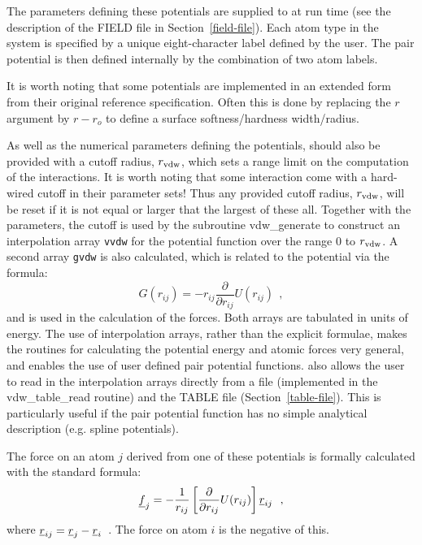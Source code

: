 The parameters defining these potentials are supplied to \D at run
time (see the description of the FIELD file in Section~\ref{field-file}).
Each atom type in the system is specified by a unique eight-character
label defined by the user.  The pair potential is then defined internally
by the combination of two atom labels.

It is worth noting that some potentials are implemented in an extended
form from their original reference specification.  Often this is done
by replacing the $r$ argument by $r-r_{o}$ to define a surface
softness/hardness width/radius.

As well as the numerical parameters defining the potentials, \D
should also be provided with a cutoff radius, $r_{\rm vdw}$, which
sets a range limit on the computation of the interactions.  It is
worth noting that some interaction come with a hard-wired cutoff in
their parameter sets!  Thus any provided cutoff radius, $r_{\rm vdw}$,
will be reset if it is not equal or larger that the largest of these all.
Together with the parameters, the cutoff is used by the subroutine
{\sc vdw\_generate} to construct an interpolation array {\tt vvdw} for
the potential function over the range 0 to $r_{\rm vdw}$.  A second
array {\tt gvdw} is also calculated, which is related to the
potential via the formula:
\begin{equation}
G(r_{ij}) = -r_{ij}\frac{\partial}{\partial r_{ij}}U(r_{ij})~~,
\end{equation}
and is used in the calculation of the forces.  Both arrays are
tabulated in units of energy.  The use of interpolation arrays,
rather than the explicit formulae, makes the routines for
calculating the potential energy and atomic forces very general, and
enables the use of user defined pair potential functions.  \D also
allows the user to read in the interpolation arrays directly from a
file (implemented in the {\sc vdw\_table\_read} routine) and the
TABLE file (Section~\ref{table-file}). This is particularly useful
if the pair potential function has no simple analytical description
(e.g. spline potentials).

The force on an atom $j$ derived from one of these potentials is
formally calculated with the standard formula:
\begin{equation}
\mbox{$\underline{f}$}_{j} = -\frac{1}{r_{ij}}\left[\frac{\partial}{\partial
r_{ij}}U(r_{ij})\right]\mbox{$\underline{r}$}_{ij}~~,
\end{equation}
where $\mbox{$\underline{r}$}_{ij} = \mbox{$\underline{r}$}_{j}-\mbox{$\underline{r}$}_{i}$~.  The force on
atom $i$ is the negative of this.

